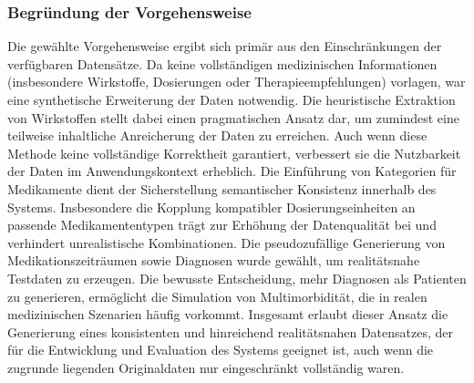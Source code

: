 \subsubsection{Begründung der Vorgehensweise}
Die gewählte Vorgehensweise ergibt sich primär aus den Einschränkungen der verfügbaren Datensätze. Da keine vollständigen medizinischen Informationen (insbesondere Wirkstoffe, Dosierungen oder Therapieempfehlungen) vorlagen, war eine synthetische Erweiterung der Daten notwendig.
Die heuristische Extraktion von Wirkstoffen stellt dabei einen pragmatischen Ansatz dar, um zumindest eine teilweise inhaltliche Anreicherung der Daten zu erreichen. Auch wenn diese Methode keine vollständige Korrektheit garantiert, verbessert sie die Nutzbarkeit der Daten im Anwendungskontext erheblich.
Die Einführung von Kategorien für Medikamente dient der Sicherstellung semantischer Konsistenz innerhalb des Systems. Insbesondere die Kopplung kompatibler Dosierungseinheiten an passende Medikamententypen trägt zur Erhöhung der Datenqualität bei und verhindert unrealistische Kombinationen.
Die pseudozufällige Generierung von Medikationszeiträumen sowie Diagnosen wurde gewählt, um realitätsnahe Testdaten zu erzeugen. Die bewusste Entscheidung, mehr Diagnosen als Patienten zu generieren, ermöglicht die Simulation von Multimorbidität, die in realen medizinischen Szenarien häufig vorkommt.
Insgesamt erlaubt dieser Ansatz die Generierung eines konsistenten und hinreichend realitätsnahen Datensatzes, der für die Entwicklung und Evaluation des Systems geeignet ist, auch wenn die zugrunde liegenden Originaldaten nur eingeschränkt vollständig waren.